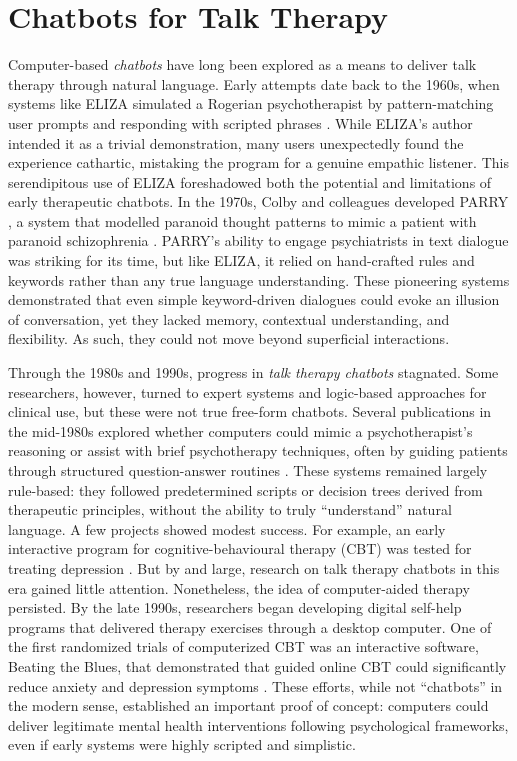 \section{Chatbots for Talk Therapy}
Computer-based \emph{chatbots} have long been explored as a means to deliver talk therapy through natural language. Early attempts date back to the 1960s, when systems like ELIZA simulated a Rogerian psychotherapist by pattern-matching user prompts and responding with scripted phrases \cite{Weizenbaum1966}. While ELIZA's author intended it as a trivial demonstration, many users unexpectedly found the experience cathartic, mistaking the program for a genuine empathic listener. This serendipitous use of ELIZA foreshadowed both the potential and limitations of early therapeutic chatbots. In the 1970s, Colby and colleagues developed PARRY \cite{10.5555/212154.212175}, a system that modelled paranoid thought patterns to mimic a patient with paranoid schizophrenia \cite{Colby1971}. PARRY's ability to engage psychiatrists in text dialogue was striking for its time, but like ELIZA, it relied on hand-crafted rules and keywords rather than any true language understanding. These pioneering systems demonstrated that even simple keyword-driven dialogues could evoke an illusion of conversation, yet they lacked memory, contextual understanding, and flexibility. As such, they could not move beyond superficial interactions.


Through the 1980s and 1990s, progress in \emph{talk therapy chatbots} stagnated. Some researchers, however, turned to expert systems and logic-based approaches for clinical use, but these were not true free-form chatbots. Several publications in the mid-1980s explored whether computers could mimic a psychotherapist's reasoning or assist with brief psychotherapy techniques, often by guiding patients through structured question-answer routines \cite{Hartman1986,Sampson1986,ServanSchreiber1986}. These systems remained largely rule-based: they followed predetermined scripts or decision trees derived from therapeutic principles, without the ability to truly ``understand'' natural language. A few projects showed modest success. For example, an early interactive program for cognitive-behavioural therapy (CBT) was tested for treating depression \cite{Selmi1990}. But by and large, research on talk therapy chatbots in this era gained little attention. Nonetheless, the idea of computer-aided therapy persisted. By the late 1990s, researchers began developing digital self-help programs that delivered therapy exercises through a desktop computer. One of the first randomized trials of computerized CBT was an interactive software, Beating the Blues, that demonstrated that guided online CBT could significantly reduce anxiety and depression symptoms \cite{Proudfoot2003}. These efforts, while not ``chatbots'' in the modern sense, established an important proof of concept: computers could deliver legitimate mental health interventions following psychological frameworks, even if early systems were highly scripted and simplistic.


